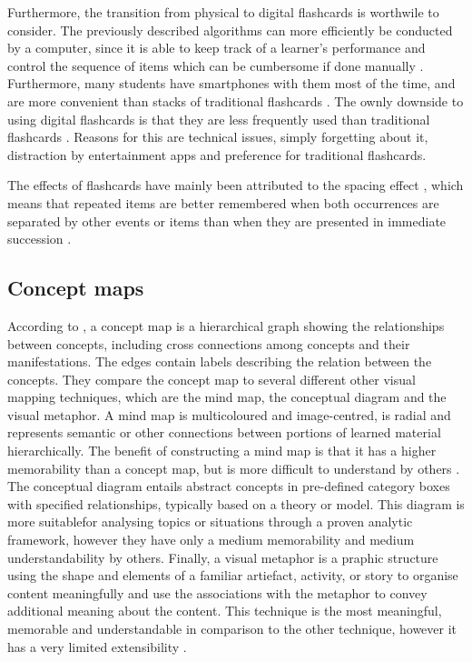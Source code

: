 Furthermore, the transition from physical to digital flashcards is worthwile to consider. The previously described algorithms can more efficiently be conducted by a computer, since it is able to keep track of a learner's performance and control the sequence of items which can be cumbersome if done manually \cite{nakata}. Furthermore, many students have smartphones with them most of the time, and are more convenient than stacks of traditional flashcards \cite{nakata}. The ownly downside to using digital flashcards is that they are less frequently used than traditional flashcards \cite{burgess}. Reasons for this are technical issues, simply forgetting about it, distraction by entertainment apps and preference for traditional flashcards.

The effects of flashcards have mainly been attributed to the spacing effect \cite{nakata, microlearning}, which means that repeated items are better remembered when both occurrences are separated by other events or items than when they are presented in immediate succession \cite{verkoeijen, logan, siegel, xue, karpicke2}.

\subsection{Concept maps}

According to , a concept map is a hierarchical graph showing the relationships between concepts, including cross connections among concepts and their manifestations. The edges contain labels describing the relation between the concepts. They compare the concept map to several different other visual mapping techniques, which are the mind map, the conceptual diagram and the visual metaphor. A mind map is multicoloured and image-centred, is radial and represents semantic or other connections between portions of learned material hierarchically. The benefit of constructing a mind map is that it has a higher memorability than a concept map, but is more difficult to understand by others \cite{eppler}. The conceptual diagram entails abstract concepts in pre-defined category boxes with specified relationships, typically based on a theory or model. This diagram is more suitablefor analysing topics or situations through a proven analytic framework, however they have only a medium memorability and medium understandability by others. Finally, a visual metaphor is a praphic structure using the shape and elements of a familiar artiefact, activity, or story to organise content meaningfully and use the associations with the metaphor to convey additional meaning about the content. This technique is the most meaningful, memorable and understandable in comparison to the other technique, however it has a very limited extensibility \cite{eppler}.

